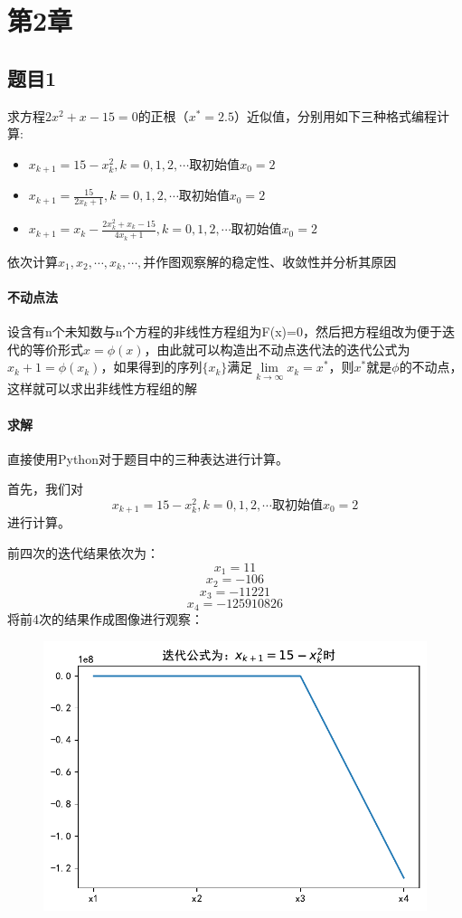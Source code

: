 \section{第2章}


\subsection{题目1}

求方程$2x^2+x-15=0$的正根（$x^*=2.5$）近似值，分别用如下三种格式编程计算:

\begin{itemize}
	\item $x_{k+1}=15-x_k^2,k=0,1,2,\cdots$取初始值$x_0=2$
	\item $x_{k+1}=\frac{15}{2x_k+1},k=0,1,2,\cdots$取初始值$x_0=2$
	\item $x_{k+1}=x_k-\frac{2x_k^2+x_k-15}{4x_k+1},k=0,1,2,\cdots$取初始值$x_0=2$
\end{itemize}

依次计算$x_1,x_2,\cdots,x_k,\cdots,$并作图观察解的稳定性、收敛性并分析其原因

\paragraph{不动点法}

设含有n个未知数与n个方程的非线性方程组为F(x)=0，然后把方程组改为便于迭代的等价形式$x=\phi (x)$，由此就可以构造出不动点迭代法的迭代公式为$x_k+1=\phi (x_k)$，如果得到的序列$\{x_k\}$满足$\lim\limits_{k\to \infty} x_k = x^*$，则$x^*$就是$\phi$的不动点，这样就可以求出非线性方程组的解

\paragraph{求解}

直接使用Python对于题目中的三种表达进行计算。

首先，我们对\[x_{k+1}=15-x_k^2,k=0,1,2,\cdots 取初始值x_0=2 \]进行计算。

前四次的迭代结果依次为：\[
x_1=11 \]\[ x_2=-106 \]\[ x_3=-11221 \]\[ x_4=-125910826
\]将前4次的结果作成图像进行观察：
\begin{figure}[H]
	\centering
	\includegraphics[width=0.7\linewidth]{2-1-1.pdf}
	\caption{}
	\label{fig:2-1-1}
\end{figure}

